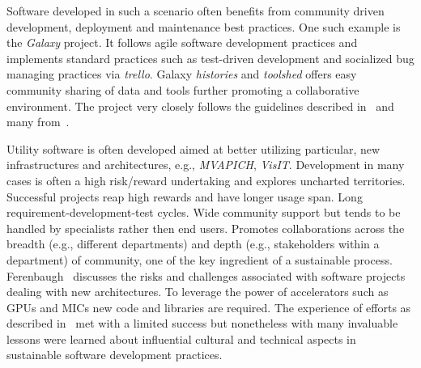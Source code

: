 \documentclass[11pt, oneside]{amsart}
\newcommand{\note}[1]{ {\textcolor{red}    { #1 }}}
\begin{document}
Software developed in such a scenario often benefits from
community driven development, deployment and maintenance best practices. One
such example is the \emph{Galaxy} project. It follows agile software
development practices and implements standard practices such as test-driven
development and socialized bug managing practices via \emph{trello}. Galaxy
\emph{histories} and \emph{toolshed} offers easy community sharing of data and
tools further promoting a collaborative environment. The project very closely
follows the guidelines described in~\cite{Carver_WSSSPE} and many
from~\cite{Prlic_WSSSPE}.

Utility software is often developed aimed at better utilizing particular, new
infrastructures and architectures, e.g., \emph{MVAPICH}, \emph{VisIT}.
Development in many cases is often a high risk/reward undertaking and explores
uncharted territories.
%
%
Successful projects reap high rewards and have longer usage span. Long
requirement-development-test cycles.  Wide community support but tends to be
handled by specialists rather then end users. Promotes collaborations across
the breadth (e.g., different departments) and depth (e.g., stakeholders within
a department) of community, one of the key ingredient of a sustainable process.
Ferenbaugh~\cite{Ferenbaugh_WSSSPE} discusses the risks and challenges
associated with software projects dealing with new architectures. To leverage
the power of accelerators such as GPUs and MICs new code and libraries are
required. The experience of efforts as described in~\cite{Ferenbaugh_WSSSPE}
met with a limited success but nonetheless with many invaluable lessons were
learned about influential cultural and technical aspects in sustainable
software development practices.
\end{document}
